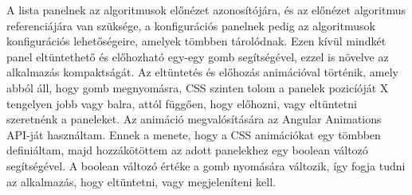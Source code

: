 A lista panelnek az algoritmusok előnézet azonosítójára, és az előnézet algoritmus referenciájára van szüksége, a konfigurációs panelnek pedig az algoritmusok konfigurációs lehetőségeire, amelyek tömbben tárolódnak. Ezen kívül mindkét panel eltüntethető és előhozható egy-egy gomb segítségével, ezzel is növelve az alkalmazás kompaktságát. Az eltüntetés és előhozás animációval történik, amely abból áll, hogy gomb megnyomásra, CSS szinten tolom a panelek pozicíóját X tengelyen jobb vagy balra, attól függően, hogy előhozni, vagy eltüntetni szeretnénk a paneleket. Az animáció megvalósítására az Angular Animations API-ját használtam. Ennek a menete, hogy a CSS animációkat egy tömbben definiáltam, majd hozzákötöttem az adott panelekhez egy boolean változó segítségével. A boolean változó értéke a gomb nyomására változik, így fogja tudni az alkalmazás, hogy eltüntetni, vagy megjeleníteni kell.


